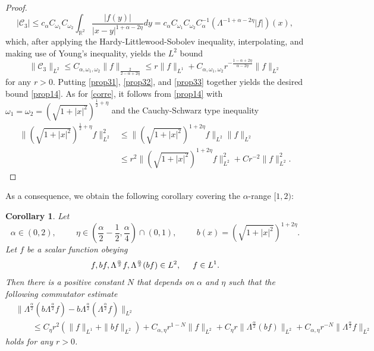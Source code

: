 \documentclass[12pt,reqno]{amsart}
\newcommand{\be}{\begin{equation}}
\newcommand{\ee}{\end{equation}}
\newtheorem{cor}[thm]{Corollary}
\newcommand{\R}{\mathbb R}
\begin{document}
\begin{proof}
\be 
|\mathcal{C}_3| \le c_{\alpha} C_{\omega_1} C_{ \omega_2} \int_{\R^2} \frac{|f(y)|}{|x-y|^{1+{\alpha}-2\eta}} dy =  c_{\alpha} C_{\omega_1} C_{ \omega_2} C_{\alpha}^{-1} (\Lambda^{-1+\alpha -2\eta} |f|)(x) ,
\ee which, after applying the Hardy-Littlewood-Sobolev inequality, interpolating, and making use of Young's inequality, yields  the $L^2$ bound
\be \label{prop33} 
\|\mathcal{C}_3\|_{L^2} \le  C_{\alpha, \omega_1, \omega_2} \|f\|_{\frac{2}{2-\alpha+2\eta}}
\le r \|f\|_{L^1} + C_{\alpha, \omega_1, \omega_2}r^{-{\frac{1-\alpha + 2\eta}{\alpha - 2\eta}}} \|f\|_{L^2} 
\ee for any $r > 0$.
Putting \eqref{prop31}, \eqref{prop32}, and \eqref{prop33} together yields the desired bound \eqref{prop14}. As for \eqref{corre}, it follows from \eqref{prop14} with $\omega_1 = \omega_2 = \left(\sqrt{1+|x|^2}\right)^{\frac{1}{2} + \eta}$ and the Cauchy-Schwarz type inequality
\be 
\begin{aligned}
\|\left(\sqrt{1+|x|^2}\right)^{\frac{1}{2} + \eta}f\|_{L^2}^2 
&\le \|\left(\sqrt{1+|x|^2}\right)^{1 + 2\eta}f\|_{L^2} \|f \|_{L^2} 
\\&\le r^2\|\left(\sqrt{1+|x|^2}\right)^{1 + 2\eta}f\|_{L^2}^2 + Cr^{-2}\|f\|_{L^2}^2.
\end{aligned}
\ee 
\end{proof}

As a consequence, we obtain the following corollary covering the $\alpha$-range $[1,2)$:


\begin{cor} \label{coro}
Let 
\be 
\alpha \in (0,2), \hspace{1cm} \eta \in \left(\frac{\alpha}{2} - \frac{1}{2}, \frac{\alpha}{4} \right) \cap (0,1), \hspace{1cm} b(x) = \left(\sqrt{1+|x|^2} \right)^{1+2\eta}.
\ee 
Let $f$ be a  scalar function obeying
\be 
f, bf, \Lambda^{\frac{\alpha}{2}}f, \Lambda^{\frac{\alpha}{2}}(bf) \in L^2, \hspace{0.5cm} f \in L^1. \ee  Then there is a positive constant $N$ that depends on $\alpha$ and $\eta$ such that the following commutator estimate
\be \label{prop15}
\begin{aligned}
&\|\Lambda^{\frac{\alpha}{2}}\left(b \Lambda^{\frac{\alpha}{2}}f\right)  - b\Lambda^{\frac{\alpha}{2}} (\Lambda^{\frac{\alpha}{2}} f)\|_{L^2}
\\&\quad\quad\le C_{\eta}r^2\left(\|f\|_{L^1} + \|bf\|_{L^2}\right) + C_{\alpha,\eta}r^{1-N}\|f\|_{L^2} + C_{\eta}r\|\Lambda^{\frac{\alpha}{2}} (bf)\|_{L^2} + C_{\alpha, \eta}r^{-N}\|\Lambda^{\frac{\alpha}{2}}f\|_{L^2}
\end{aligned}
\ee holds for any $r > 0$. 
\end{cor}
\end{document}
